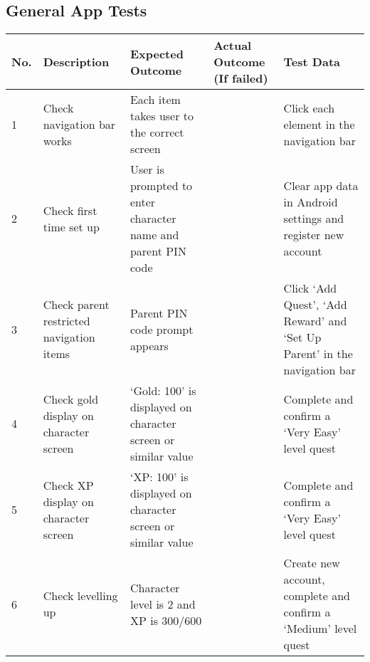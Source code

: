 \begin{landscape}
\section{General App Tests}
\begin{tabularx}{\linewidth}{p{1cm} X X X X}
\textbf{No.} & \textbf{Description}                    & \textbf{Expected Outcome}                                  	& \textbf{Actual Outcome (If failed)} & \textbf{Test Data}                                          \\ \hline
1            & Check navigation bar works               & Each item takes user to the correct screen                       &                                     & Click each element in the navigation bar                                  \\ \hline
2            & Check first time set up                  & User is prompted to enter character name and parent PIN code     &                                     & Clear app data in Android settings and register new account               \\ \hline
3            & Check parent restricted navigation items & Parent PIN code prompt appears                                   &                                     & Click `Add Quest', `Add Reward' and `Set Up Parent' in the navigation bar \\ \hline
4            & Check gold display on character screen   & `Gold: 100' is displayed on character screen or similar value &                                     & Complete and confirm a `Very Easy' level quest                           \\ \hline
5            & Check XP display on character screen     & `XP: 100' is displayed on character screen or similar value   &                                     & Complete and confirm a `Very Easy' level quest                           \\ \hline
6            & Check levelling up                       & Character level is 2 and XP is 300/600                           &                                     & Create new account, complete and confirm a `Medium' level quest          \\ \hline
\end{tabularx} 


\end{landscape}
